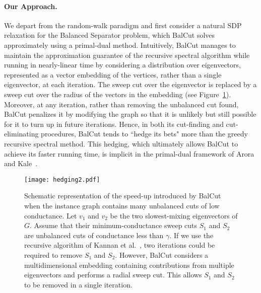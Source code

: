 \documentclass[twoside,leqno,twocolumn]{article}
\newcommand{\BS}{{\sc Balanced Separator}\xspace}
\newcommand{\SDP}{{\sf SDP}\xspace}
\numberwithin{equation}{section}
\newcommand{\alg}{{\sc BalCut}\xspace}
\begin{document}
\paragraph{Our Approach.} 
We depart from the random-walk paradigm and first consider  a natural {{\SDP}} relaxation for the {\BS} problem, which \alg solves approximately using a primal-dual method.
Intuitively, \alg manages to maintain the approximation guarantee of the recursive spectral algorithm while running in nearly-linear time by considering a distribution over eigenvectors,  represented as a vector embedding of the vertices, rather than a single eigenvector, at each iteration. The sweep cut over the eigenvector is replaced by a sweep cut over the radius of the vectors in the embedding (see Figure~\ref{fig:hedging}).
Moreover, at any iteration, rather than removing the unbalanced cut found, \alg penalizes it by modifying the graph so that it is unlikely but still possible for it to turn up in future iterations. Hence, in both its cut-finding and cut-eliminating procedures, \alg tends to ``hedge its bets" more than the greedy recursive spectral method. This hedging, which ultimately allows \alg to achieve its faster running time, is implicit in the primal-dual framework of Arora and Kale~\cite{AK}.

\begin{figure}[!h]
\begin{center}
\texttt{[image: hedging2.pdf]}
\caption{Schematic representation of the speed-up introduced by \alg when the instance graph contains many unbalanced cuts of low conductance. Let $v_1$ and $v_2$ be the two slowest-mixing eigenvectors of $G.$ Assume that their minimum-conductance sweep cuts $S_1$ and $S_2$ are unbalanced cuts of conductance less than $\gamma.$ If we use the recursive algorithm of Kannan et al.~\cite{Kannan}, two iterations could be required to remove $S_1$ and $S_2$. However, \alg considers a multidimensional embedding containing contributions from multiple eigenvectors and performs a radial sweep cut. This allows $S_1$ and $S_2$ to be removed in a single iteration.}
\label{fig:hedging}
\end{center}
\vspace{-8mm}
\end{figure}
\end{document}
